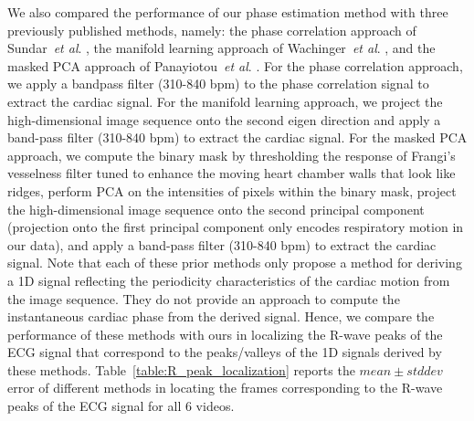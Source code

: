 \documentclass[journal]{IEEEtran}
\newcommand{\etal}{~\textit{et al}. }
\begin{document}
	We also compared the performance of our phase estimation method with three previously published methods, namely: the phase correlation approach of Sundar\etal\cite{Sundar2009}, the manifold learning approach of Wachinger\etal\cite{Wachinger2012}, and the masked PCA approach of Panayiotou\etal\cite{Panayiotou2014}. For the phase correlation approach, we apply a bandpass filter (310-840 bpm) to the phase correlation signal to extract the cardiac signal. For the manifold learning approach, we project the high-dimensional image sequence onto the second eigen direction and apply a band-pass filter (310-840 bpm) to extract the cardiac signal. For the masked PCA approach, we compute the binary mask by thresholding the response of Frangi's vesselness filter tuned to enhance the moving heart chamber walls that look like ridges, perform PCA on the intensities of pixels within the binary mask,  project the high-dimensional image sequence onto the second principal component (projection onto the first principal component only encodes respiratory motion in our data), and apply a band-pass filter (310-840 bpm) to extract the cardiac signal. Note that each of these prior methods only propose a method for deriving a 1D signal reflecting the periodicity characteristics of the cardiac motion from the image sequence. They do not provide an approach to compute the instantaneous cardiac phase from the derived signal. Hence, we compare the performance of these methods with ours in localizing the R-wave peaks of the ECG signal that correspond to the peaks/valleys of the 1D signals derived by these methods. Table~\ref{table:R_peak_localization} reports the $mean \pm stddev$ error of different methods in locating the frames corresponding to the R-wave peaks of the ECG signal for all 6 videos. 
	
\end{document}
